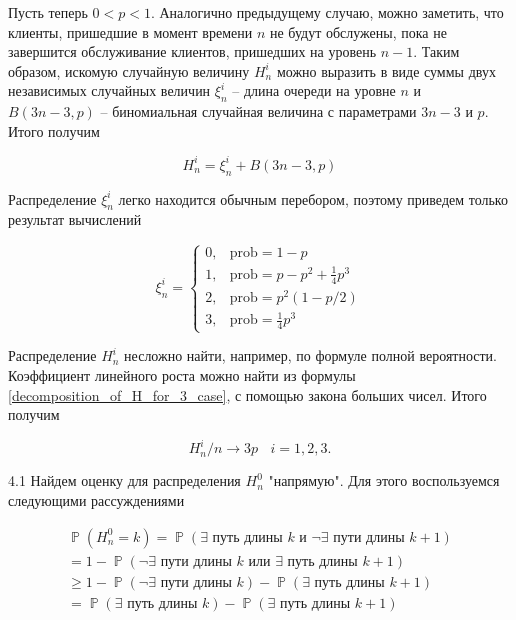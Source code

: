 \documentclass[10pt, reqno]{amsart}
\DeclareMathOperator*{\Pb}{\mathbb{P}}
\begin{document}
  Пусть теперь $0 < p < 1$. Аналогично предыдущему случаю, можно заметить, что клиенты, пришедшие в момент времени $n$ не будут обслужены, пока не завершится обслуживание клиентов, пришедших на уровень $n-1$. Таким образом, искомую случайную величину $H_{n}^{i}$ можно выразить в виде суммы двух независимых случайных величин $\xi_{n}^{i}$ -- длина очереди на уровне $n$ и $B(3n-3, p)$ -- биномиальная случайная величина с параметрами $3n-3$ и $p$. Итого получим
  
  \begin{equation}
      H_{n}^{i} = \xi_{n}^{i} + B(3n-3, p)
      \label{decomposition_of_H_for_3_case}
  \end{equation}
  
  Распределение $\xi_{n}^{i}$ легко находится обычным перебором, поэтому приведем только результат вычислений
  
  \begin{equation}
      \xi_{n}^{i} = \begin{cases}
      0, & \text{prob} = 1-p \\
      1, & \text{prob} = p - p^{2} + \frac{1}{4}p^{3} \\
      2, & \text{prob} = p^{2}(1-p/2) \\
      3, & \text{prob} = \frac{1}{4}p^{3}
      \end{cases}
  \end{equation}
  
  Распределение $H_{n}^{i}$ несложно найти, например, по формуле полной вероятности. Коэффициент линейного роста можно найти из формулы \ref{decomposition_of_H_for_3_case}, с помощью закона больших чисел. Итого получим
  
  \begin{equation}
      H_{n}^{i}/n \xrightarrow{} 3p \:\:\:\: i = 1,2,3.
  \end{equation}
  
  4.1 Найдем оценку для распределения $H_{n}^{0}$ "напрямую". Для этого воспользуемся следующими рассуждениями
  
  \begin{align*}
    \Pb(H_{n}^{0} = k) = \Pb(\exists \text{ путь длины } k \text{ и } \neg\exists \text{ пути длины } k+1) \\ = 1 - \Pb(\neg\exists \text{ пути длины } k \text{ или } \exists \text{ путь длины } k+1) \\ \geq 1 - \Pb(\neg\exists \text{ пути длины } k) - \Pb(\exists \text{ путь длины } k+1) \\ = \Pb(\exists \text{ путь длины } k) - \Pb(\exists \text{ путь длины } k+1)
  \end{align*}
  
\end{document}
